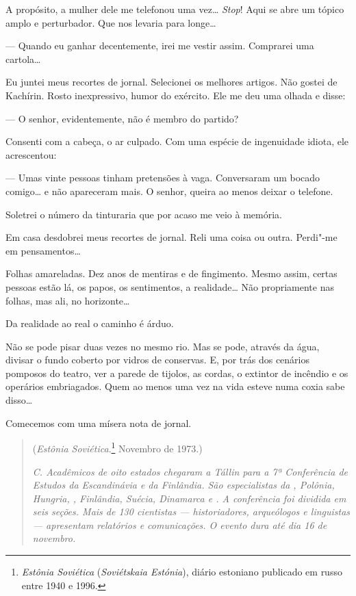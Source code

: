 A propósito, a mulher dele me telefonou uma vez\ldots{} \emph{Stop}! Aqui se
abre um tópico amplo e perturbador. Que nos levaria para longe\ldots{}

--- Quando eu ganhar decentemente, irei me vestir assim. Comprarei uma
cartola\ldots{}

Eu juntei meus recortes de jornal. Selecionei os melhores artigos. Não
gostei de Kachírin. Rosto inexpressivo, humor do exército. Ele me deu
uma olhada e disse:

--- O senhor, evidentemente, não é membro do partido?

Consenti com a cabeça, o ar culpado. Com uma espécie de ingenuidade
idiota, ele acrescentou:

--- Umas vinte pessoas tinham pretensões à vaga. Conversaram um bocado
comigo\ldots{} e não apareceram mais. O senhor, queira ao menos deixar o
telefone.

Soletrei o número da tinturaria que por acaso me veio à memória.

Em casa desdobrei meus recortes de jornal. Reli uma coisa ou outra.
Perdi"-me em pensamentos\ldots{}

Folhas amareladas. Dez anos de mentiras e de fingimento. Mesmo assim,
certas pessoas estão lá, os papos, os sentimentos, a realidade\ldots{} Não
propriamente nas folhas, mas ali, no horizonte\ldots{}

Da realidade ao real o caminho é árduo.

Não se pode pisar duas vezes no mesmo rio. Mas se pode, através da água,\label{ref0}
divisar o fundo coberto por vidros de conservas. E, por trás dos
cenários pomposos do teatro, ver a parede de tijolos, as cordas, o
extintor de incêndio e os operários embriagados. Quem ao menos uma vez
na vida esteve numa coxia sabe disso\ldots{}

Comecemos com uma mísera nota de jornal.

\movetooddpage
\begin{center}
{}
\end{center}


\begin{quotation}
\begin{flushright}
(\emph{Estônia Soviética}.\footnote{\emph{Estônia Soviética}
  (\emph{Soviétskaia Estónia}), diário estoniano publicado em russo
  en­tre 1940 e 1996.} Novembro de 1973.)\\
\end{flushright}
\vspace{4pt}
\noindent\emph{C. Acadêmicos de oito estados chegaram a
Tállin para a 7ª Conferência de Estudos da Escandinávia e da Finlândia.
São especialistas da , Polônia, Hungria, , Finlândia, Suécia,
Dinamarca e . A conferência foi dividida em seis seções. Mais de 130
cientistas --- historiadores, arqueólogos e linguistas --- apresentam
relatórios e comunicações. O evento dura até dia 16 de novembro.}
\end{quotation}

